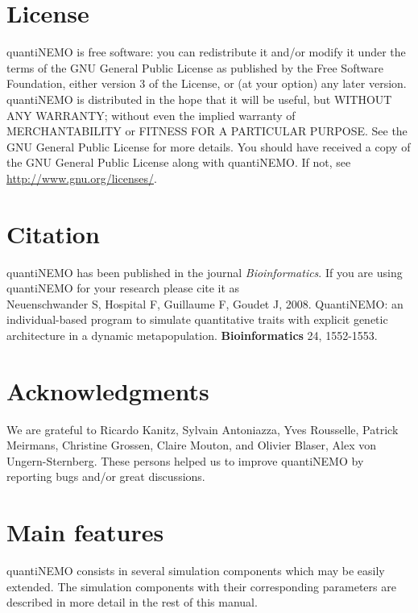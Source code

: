 \documentclass[letterpaper,12pt,oneside]{book}
\begin{document}
\section{License}
quantiNEMO is free software: you can redistribute it and/or modify it under the terms of the GNU General Public License as published by the Free Software Foundation, either version 3 of the License, or (at your option) any later version. quantiNEMO is distributed in the hope that it will be useful, but WITHOUT ANY WARRANTY; without even the implied warranty of MERCHANTABILITY or FITNESS FOR A PARTICULAR PURPOSE.  See the GNU General Public License for more details. You should have received a copy of the GNU General Public License along with quantiNEMO. If not, see \linebreak\url{http://www.gnu.org/licenses/}.

\section{Citation}
quantiNEMO has been published in the journal \textit{Bioinformatics}. If you are using quantiNEMO for your research please cite it as \\
 Neuenschwander S, Hospital F, Guillaume F, Goudet J, 2008. QuantiNEMO: an individual-based program to simulate quantitative traits with explicit genetic architecture in a dynamic metapopulation. \textbf{Bioinformatics} 24, 1552-1553.

\section{Acknowledgments}
We are grateful to Ricardo Kanitz, Sylvain Antoniazza, Yves Rousselle, Patrick Meirmans, Christine Grossen, Claire Mouton, and Olivier Blaser, Alex von Ungern-Sternberg. These persons helped us to improve quantiNEMO by reporting bugs and/or great discussions. 

\section{Main features}
quantiNEMO consists in several simulation components which may be easily extended. The simulation components with their corresponding parameters are described in more detail in the rest of this manual. 
\end{document}
